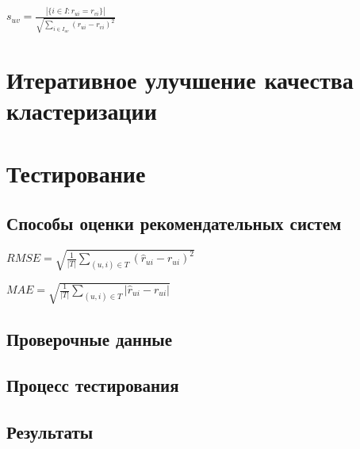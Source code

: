 \documentclass[12pt]{article} %
\begin{document}
\vspace*{2\baselineskip}

$s_{uv} = \frac{|\{i \in I: r_{ui} = r_{vi}\}|}{\sqrt{\sum_{i \in I_{uv}} (r_{ui} - r_{vi})^2 }}$




\section{Итеративное улучшение качества кластеризации}

\section{Тестирование}
\subsection{Способы оценки рекомендательных систем}

$RMSE=\sqrt{\frac{1}{|T|}\sum_{(u,i)\in T} (\hat{r}_{ui} - r_{ui})^2}$

$MAE=\sqrt{\frac{1}{|T|}\sum_{(u,i)\in T} |\hat{r}_{ui} - r_{ui}|}$

\subsection{Проверочные данные}


\subsection{Процесс тестирования}

\subsection{Результаты}
\end{document}
